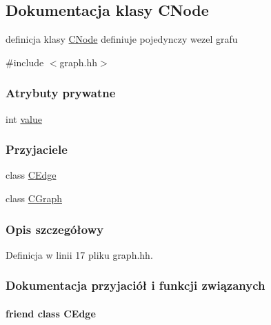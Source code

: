 \hypertarget{class_c_node}{}\subsection{Dokumentacja klasy C\+Node}
\label{class_c_node}


definicja klasy \hyperlink{class_c_node}{C\+Node} definiuje pojedynczy wezel grafu  




{\ttfamily \#include $<$graph.\+hh$>$}

\subsubsection*{Atrybuty prywatne}
\begin{DoxyCompactItemize}
\item 
int \hyperlink{class_c_node_ad08aa99402f6cfbbb9d9580d1f001441}{value}
\end{DoxyCompactItemize}
\subsubsection*{Przyjaciele}
\begin{DoxyCompactItemize}
\item 
class \hyperlink{class_c_node_a0447ad471d74d1dfa4bfd184bccd1b36}{C\+Edge}
\item 
class \hyperlink{class_c_node_a5ba04087b017dfeadb708ba91d6daf1b}{C\+Graph}
\end{DoxyCompactItemize}


\subsubsection{Opis szczegółowy}


Definicja w linii 17 pliku graph.\+hh.



\subsubsection{Dokumentacja przyjaciół i funkcji związanych}
\hypertarget{class_c_node_a0447ad471d74d1dfa4bfd184bccd1b36}{}
\paragraph[{C\+Edge}]{\setlength{\rightskip}{0pt plus 5cm}friend class {\bf C\+Edge}\hspace{0.3cm}{\ttfamily [friend]}}\label{class_c_node_a0447ad471d74d1dfa4bfd184bccd1b36}


